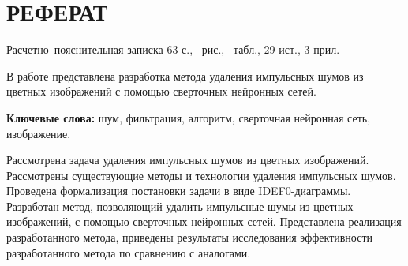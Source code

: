 \section*{РЕФЕРАТ}

Расчетно--пояснительная записка 63 с., \totalfigures\ рис., \totaltables\ табл., 29 ист., 3 прил.

В работе представлена разработка метода удаления импульсных шумов из цветных изображений с помощью сверточных
нейронных сетей.

\textbf{Ключевые слова:} шум, фильтрация, алгоритм, сверточная нейронная сеть, изображение.

Рассмотрена задача удаления импульсных шумов из цветных изображений.
Рассмотрены существующие методы и технологии удаления импульсных шумов.
Проведена формализация постановки задачи в виде IDEF0-диаграммы.
Разработан метод, позволяющий удалить импульсные шумы из цветных изображений, с помощью сверточных нейронных сетей.
Представлена реализация разработанного метода, приведены результаты исследования эффективности разработанного метода по сравнению с аналогами.
